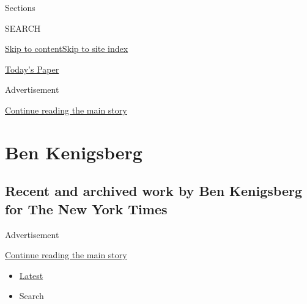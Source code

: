 Sections

SEARCH

\protect\hyperlink{site-content}{Skip to
content}\protect\hyperlink{site-index}{Skip to site index}

\href{https://myaccount.nytimes.com/auth/login?response_type=cookie\&client_id=vi}{}

\href{https://www.nytimes.com/section/todayspaper}{Today's Paper}

Advertisement

\protect\hyperlink{after-top}{Continue reading the main story}

\hypertarget{ben-kenigsberg}{%
\section{Ben Kenigsberg}\label{ben-kenigsberg}}

\hypertarget{recent-and-archived-work-by-ben-kenigsberg-for-the-new-york-times}{%
\subsection{Recent and archived work by Ben Kenigsberg for The New York
Times}\label{recent-and-archived-work-by-ben-kenigsberg-for-the-new-york-times}}

Advertisement

\protect\hyperlink{after-mid1}{Continue reading the main story}

\begin{itemize}
\tightlist
\item
  \protect\hyperlink{stream-panel}{Latest}
\item
  Search
\end{itemize}

